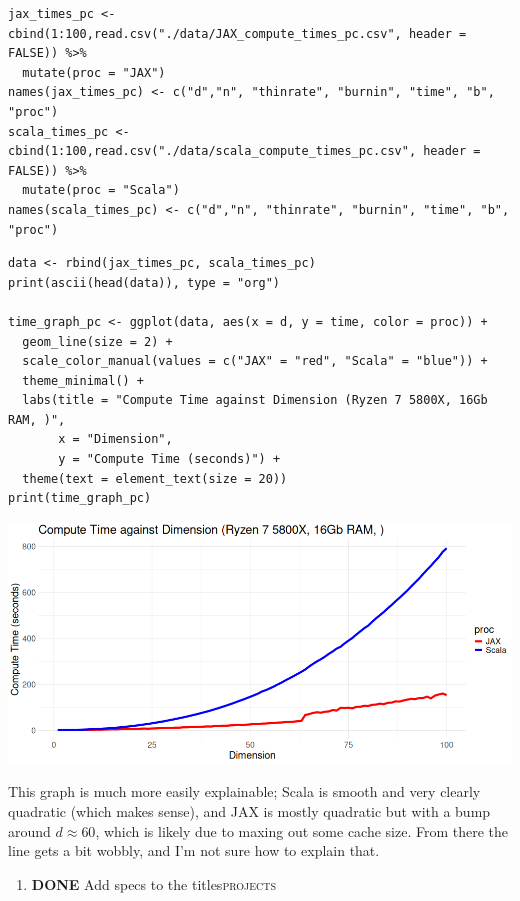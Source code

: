 \documentclass[letterpaper]{article}
\begin{document}
\begin{verbatim}
jax_times_pc <- cbind(1:100,read.csv("./data/JAX_compute_times_pc.csv", header = FALSE)) %>%
  mutate(proc = "JAX")
names(jax_times_pc) <- c("d","n", "thinrate", "burnin", "time", "b", "proc")
scala_times_pc <- cbind(1:100,read.csv("./data/scala_compute_times_pc.csv", header = FALSE)) %>%
  mutate(proc = "Scala")
names(scala_times_pc) <- c("d","n", "thinrate", "burnin", "time", "b", "proc")
\end{verbatim}



\begin{verbatim}
data <- rbind(jax_times_pc, scala_times_pc)
print(ascii(head(data)), type = "org")

time_graph_pc <- ggplot(data, aes(x = d, y = time, color = proc)) +
  geom_line(size = 2) +
  scale_color_manual(values = c("JAX" = "red", "Scala" = "blue")) +
  theme_minimal() + 
  labs(title = "Compute Time against Dimension (Ryzen 7 5800X, 16Gb RAM, )",
       x = "Dimension",
       y = "Compute Time (seconds)") +
  theme(text = element_text(size = 20))
print(time_graph_pc)
\end{verbatim}

\begin{center}
\includegraphics[width=.9\linewidth]{./Figures/plot_complexity_pc.png}
\label{org878d697}
\end{center}

This graph is much more easily explainable; Scala is smooth and very clearly quadratic (which makes sense), and JAX is mostly quadratic but with a bump around \(d\approx60\), which is likely due to maxing out some cache size. From there the line gets a bit wobbly, and I'm not sure how to explain that.
\begin{enumerate}
\item {\bfseries\sffamily DONE} Add specs to the titles\hfill{}\textsc{projects}
\label{sec:orgc48b162}
\end{enumerate}
\end{document}

